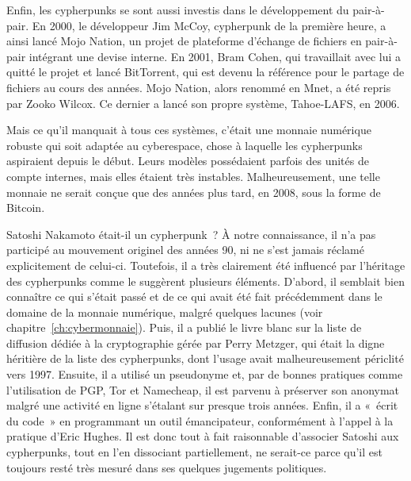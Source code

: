 Enfin, les cypherpunks se sont aussi investis dans le développement du pair-à-pair. En 2000, le développeur Jim McCoy, cypherpunk de la première heure, a ainsi lancé Mojo Nation, un projet de plateforme d'échange de fichiers en pair-à-pair intégrant une devise interne. En 2001, Bram Cohen, qui travaillait avec lui a quitté le projet et lancé BitTorrent, qui est devenu la référence pour le partage de fichiers au cours des années. Mojo Nation, alors renommé en Mnet, a été repris par Zooko Wilcox. Ce dernier a lancé son propre système, Tahoe-LAFS, en 2006. %

Mais ce qu'il manquait à tous ces systèmes, c'était une monnaie numérique robuste qui soit adaptée au cyberespace, chose à laquelle les cypherpunks aspiraient depuis le début. Leurs modèles possédaient parfois des unités de compte internes, mais elles étaient très instables. Malheureusement, une telle monnaie ne serait conçue que des années plus tard, en 2008, sous la forme de Bitcoin.

Satoshi Nakamoto était-il un cypherpunk~? À notre connaissance, il n'a pas participé au mouvement originel des années 90, ni ne s'est jamais réclamé explicitement de celui-ci. Toutefois, il a très clairement été influencé par l'héritage des cypherpunks comme le suggèrent plusieurs éléments. D'abord, il semblait bien connaître ce qui s'était passé et de ce qui avait été fait précédemment dans le domaine de la monnaie numérique, malgré quelques lacunes (voir chapitre~\ref{ch:cybermonnaie}). Puis, il a publié le livre blanc sur la liste de diffusion dédiée à la cryptographie gérée par Perry Metzger, qui était la digne héritière de la liste des cypherpunks, dont l'usage avait malheureusement périclité vers 1997. Ensuite, il a utilisé un pseudonyme et, par de bonnes pratiques comme l'utilisation de PGP, Tor et Namecheap, il est parvenu à préserver son anonymat malgré une activité en ligne s'étalant sur presque trois années. Enfin, il a «~écrit du code~» en programmant un outil émancipateur, conformément à l'appel à la pratique d'Eric Hughes. Il est donc tout à fait raisonnable d'associer Satoshi aux cypherpunks, tout en l'en dissociant partiellement, ne serait-ce parce qu'il est toujours resté très mesuré dans ses quelques jugements politiques.

